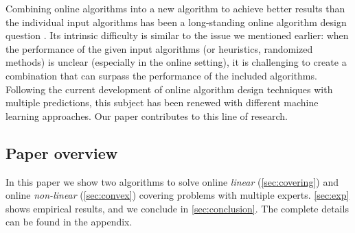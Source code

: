Combining online algorithms into a new algorithm to achieve better results than the individual input algorithms has been a long-standing online algorithm design question \cite{AzarBroder93:On-line-Choice,BlumBurch00:On-line-Learning}.
Its intrinsic difficulty is similar to the issue we mentioned earlier: when the performance of the given input algorithms (or heuristics, randomized methods) is unclear (especially in the online setting), it is challenging to create a combination that can surpass the performance of the included algorithms.
Following the current development of online algorithm design techniques with multiple predictions, this subject has been renewed with different machine learning approaches. Our paper contributes to this line of research.

\subsection{Paper overview}
In this paper we show two algorithms to solve online \emph{linear} (\cref{sec:covering}) and online \emph{non-linear} (\cref{sec:convex}) covering problems with multiple experts.  \cref{sec:exp} shows empirical results, and we conclude in \cref{sec:conclusion}. The complete details can be found in the appendix.
